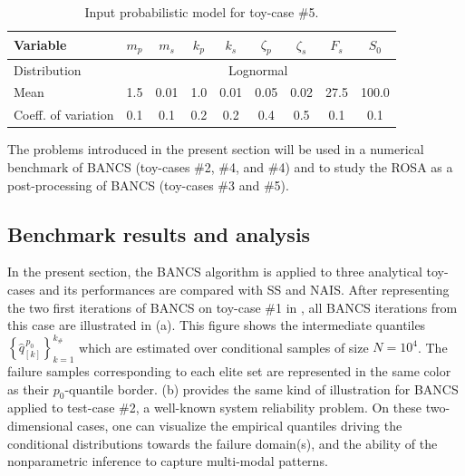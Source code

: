 \begin{table}[h]
\centering
\begin{tabular}{ lcccccccc }
    \hline
    Variable            & $m_p$ & $m_s$ & $k_p$ & $k_s$ & $\zeta_p$ & $\zeta_s$ & $F_s$ & $S_0$ \\
    \hline          
    Distribution        &  \multicolumn{8}{c}{Lognormal} \\ 
    Mean                & 1.5 & 0.01 & 1.0 & 0.01 & 0.05 & 0.02 & 27.5 & 100.0\\ 
    Coeff. of variation & 0.1 & 0.1 & 0.2 & 0.2 & 0.4 & 0.5 & 0.1 & 0.1\\
    \hline
\end{tabular}
\caption{Input probabilistic model for toy-case \#5.}
\label{tab:oscillator}
\end{table}

The problems introduced in the present section will be used in a numerical benchmark of BANCS (toy-cases \#2, \#4, and \#4) and to study the ROSA as a post-processing of BANCS (toy-cases \#3 and \#5). 

\subsection{Benchmark results and analysis}

In the present section, the BANCS algorithm is applied to three analytical toy-cases and its performances are compared with SS and NAIS. 
After representing the two first iterations of BANCS on toy-case \#1 in , all BANCS iterations from this case are illustrated in  (a). 
This figure shows the intermediate quantiles $\left\{\widehat{q}_{[k]}^{\, p_0}\right\}_{k=1}^{k_\#}$ which are estimated over conditional samples of size $N=10^4$. 
The failure samples corresponding to each elite set are represented in the same color as their $p_0$-quantile border. 
 (b) provides the same kind of illustration for BANCS applied to test-case \#2, a well-known system reliability problem. 
On these two-dimensional cases, one can visualize the empirical quantiles driving the conditional distributions towards the failure domain(s), and the ability of the nonparametric inference to capture multi-modal patterns.  

